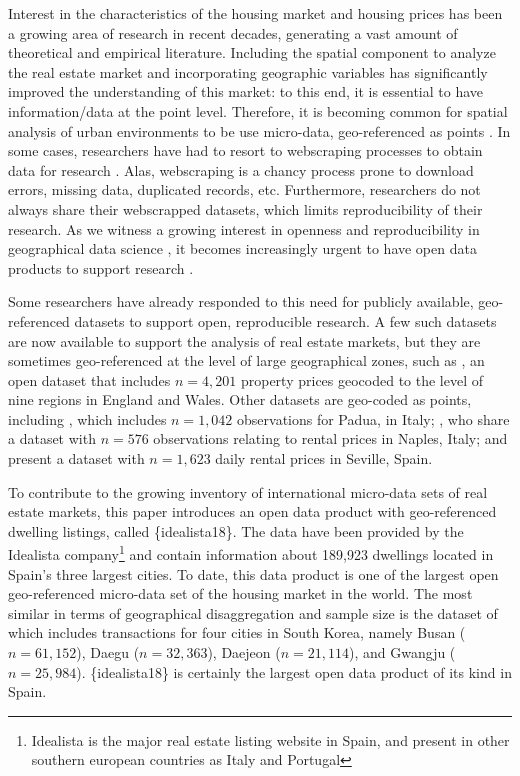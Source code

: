 \documentclass[Royal,times,sageh]{sagej}
\begin{document}
Interest in the characteristics of the housing market and housing prices
has been a growing area of research in recent decades, generating a vast
amount of theoretical and empirical literature. Including the spatial
component to analyze the real estate market and incorporating geographic
variables has significantly improved the understanding of this market:
to this end, it is essential to have information/data at the point
level. Therefore, it is becoming common for spatial analysis of urban
environments to be use micro-data, geo-referenced as points
\citep{lopez2015}. In some cases, researchers have had to resort to
webscraping processes to obtain data for research
\citep[e.g.,][]{Li2019, lopez2015}. Alas, webscraping is a chancy
process prone to download errors, missing data, duplicated records, etc.
Furthermore, researchers do not always share their webscrapped datasets,
which limits reproducibility of their research. As we witness a growing
interest in openness and reproducibility in geographical data science
\citep{arribasl2021editorial, paez2021open, brunsdon2021opening}, it
becomes increasingly urgent to have open data products to support
research \citep{arribas2021}.

Some researchers have already responded to this need for publicly
available, geo-referenced datasets to support open, reproducible
research. A few such datasets are now available to support the analysis
of real estate markets, but they are sometimes geo-referenced at the
level of large geographical zones, such as \citet{fuerst2020real}, an
open dataset that includes \(n=4,201\) property prices geocoded to the
level of nine regions in England and Wales. Other datasets are geo-coded
as points, including \citet{bonifaci2015real}, which includes
\(n=1,042\) observations for Padua, in Italy;
\citet{delgiudice2018housing}, who share a dataset with \(n=576\)
observations relating to rental prices in Naples, Italy; and
\citet{solano2019dataset} present a dataset with \(n=1,623\) daily
rental prices in Seville, Spain.

To contribute to the growing inventory of international micro-data sets
of real estate markets, this paper introduces an open data product with
geo-referenced dwelling listings, called \{idealista18\}. The data have
been provided by the Idealista
company\footnote{Idealista is the major real estate listing website in Spain, and present in other southern european countries as Italy and Portugal}
and contain information about 189,923 dwellings located in Spain's three
largest cities. To date, this data product is one of the largest open
geo-referenced micro-data set of the housing market in the world. The
most similar in terms of geographical disaggregation and sample size is
the dataset of \citet{song2021hedonic} which includes transactions for
four cities in South Korea, namely Busan (\(n=61,152\)), Daegu
(\(n=32,363\)), Daejeon (\(n=21,114\)), and Gwangju (\(n=25,984\)).
\{idealista18\} is certainly the largest open data product of its kind
in Spain.
\end{document}
